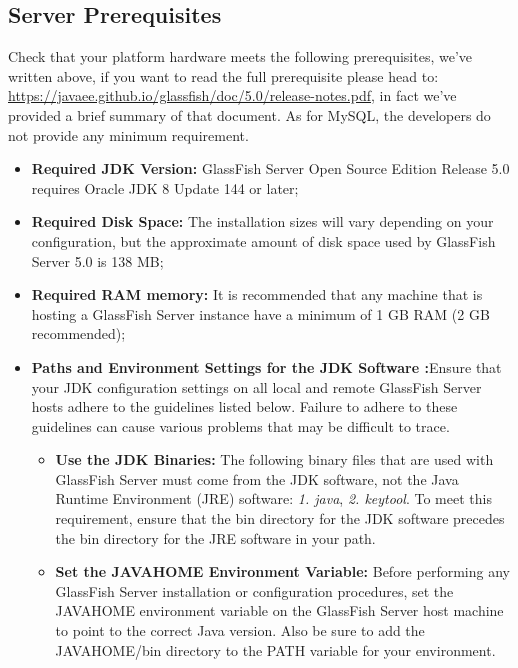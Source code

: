 \subsection{Server Prerequisites}
\label{subsect:ServerPrerequisites}
Check that your platform hardware meets the following prerequisites, we've written above, if you want to read the full prerequisite please head to: \href{https://javaee.github.io/glassfish/doc/5.0/release-notes.pdf}{\color{blue}https://javaee.github.io/glassfish/doc/5.0/release-notes.pdf}, in fact we've provided a brief summary of that document. As for MySQL, the developers do not provide any minimum requirement. 
\begin{itemize}
	\item \textbf{Required JDK Version:} GlassFish Server Open Source Edition Release 5.0 requires Oracle JDK 8 Update 144 or later;
	\item \textbf{Required Disk Space:} The installation sizes will vary depending on your configuration, but the approximate amount of disk space used by GlassFish Server 5.0 is 138 MB;
	\item \textbf{Required RAM memory:} It is recommended that any machine that is hosting a GlassFish Server instance have a minimum of 1 GB RAM (2 GB recommended); 
	\item \textbf{Paths and Environment Settings for the JDK Software :}Ensure that your JDK configuration settings on all local and remote GlassFish Server hosts adhere to the guidelines listed below. Failure to adhere to these guidelines can cause various problems that may be difficult to trace.
	\begin{itemize}
		\item \textbf{Use the JDK Binaries:} The following binary files that are used with GlassFish Server must come from the JDK software, not the Java Runtime Environment (JRE) software: \textit{1. java}, \textit{2. keytool}. To meet this requirement, ensure that the bin directory for the JDK software precedes the bin directory for the JRE software in your path.
		\item \textbf{Set the JAVA\textunderscore HOME Environment Variable:} Before performing any GlassFish Server installation or configuration procedures, set the JAVA\textunderscore HOME environment variable on the GlassFish Server host machine to point to the correct Java version. Also be sure to add the JAVA\textunderscore HOME/bin directory to the PATH variable for your environment.
	\end{itemize}
\end{itemize}

